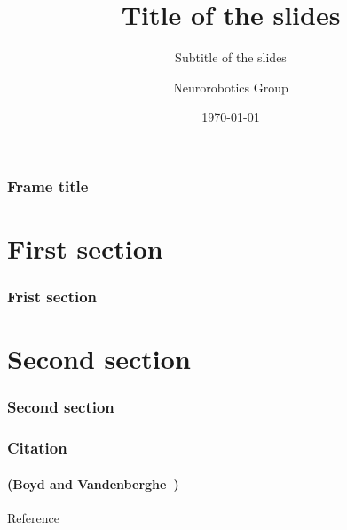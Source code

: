 \documentclass[aspectratio=3218, 10pt, usepdftitle=false]{beamer}
\title{Title of the slides}
\subtitle{Subtitle of the slides}
\author{Neurorobotics Group}
\institute{Department of Computer Science\\University of Freiburg}
\date{\today}
\begin{document}
\begin{frame}[plain]
    \titlepage{}
\end{frame}

\begin{frame}
    \frametitle{Frame title}

    

\end{frame}

\section{First section}
\begin{frame}
    \frametitle{Frist section}
    
\end{frame}

\section{Second section}
\begin{frame}
    \frametitle{Second section}

\end{frame}

\begin{frame}
    \frametitle{Citation}
    \framesubtitle{(Boyd and Vandenberghe~\cite{boyd2004convex})}

\end{frame}

\begin{frame}[plain]{Reference}
    \footnotesize
    \nocite{*}
    
\end{frame}
\end{document}
